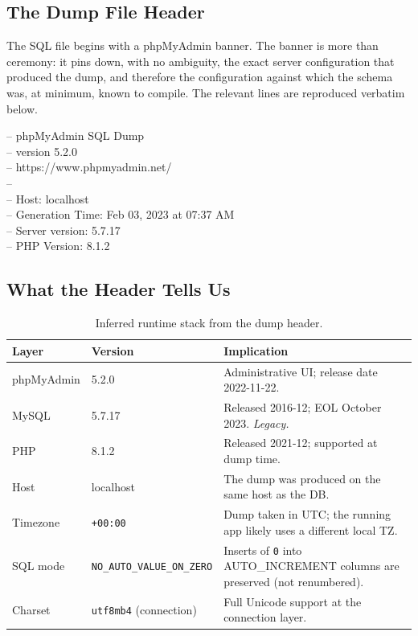 \documentclass[11pt,a4paper]{article}
\begin{document}
\subsection{The Dump File Header}

The SQL file begins with a phpMyAdmin banner. The banner is more than
ceremony: it pins down, with no ambiguity, the exact server configuration
that produced the dump, and therefore the configuration against which the
schema was, at minimum, known to compile. The relevant lines are reproduced
verbatim below.

\begin{tcolorbox}[enhanced,colback=nodefillgray,colframe=black!40,boxrule=0.3pt,arc=2pt,left=8pt,right=8pt,top=4pt,bottom=4pt,fontupper=\small\ttfamily]
-- phpMyAdmin SQL Dump\\
-- version 5.2.0\\
-- https://www.phpmyadmin.net/\\
--\\
-- Host: localhost\\
-- Generation Time: Feb 03, 2023 at 07:37 AM\\
-- Server version: 5.7.17\\
-- PHP Version: 8.1.2
\end{tcolorbox}

\subsection{What the Header Tells Us}

\begin{table}[htbp]
\centering
\caption{Inferred runtime stack from the dump header.}\label{tab:stack}
\small
\begin{tabularx}{\columnwidth}{llX}
\toprule
\textbf{Layer} & \textbf{Version} & \textbf{Implication} \\
\midrule
phpMyAdmin & 5.2.0  & Administrative UI; release date 2022-11-22. \\
MySQL      & 5.7.17 & Released 2016-12; EOL October 2023. \emph{Legacy.} \\
PHP        & 8.1.2  & Released 2021-12; supported at dump time. \\
Host       & localhost & The dump was produced on the same host as the DB. \\
Timezone   & \texttt{+00:00} & Dump taken in UTC; the running app likely uses a different local TZ. \\
SQL mode   & \texttt{NO\_AUTO\_VALUE\_ON\_ZERO} & Inserts of \texttt{0} into AUTO\_INCREMENT columns are preserved (not renumbered). \\
Charset    & \texttt{utf8mb4} (connection) & Full Unicode support at the connection layer. \\
\bottomrule
\end{tabularx}
\end{table}
\end{document}
